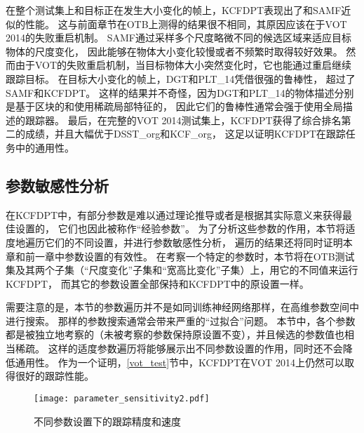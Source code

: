 在整个测试集上和目标正在发生大小变化的帧上，KCFDPT表现出了和SAMF近似的性能。
这与前面章节在OTB上测得的结果很不相同，其原因应该在于VOT 2014的失败重启机制。
SAMF通过采样多个尺度略微不同的候选区域来适应目标物体的尺度变化，
因此能够在物体大小变化较慢或者不频繁时取得较好效果。
然而由于VOT的失败重启机制，当目标物体大小突然变化时，它也能通过重启继续跟踪目标。
在目标大小变化的帧上，DGT和PLT\_14凭借很强的鲁棒性，
超过了SAMF和KCFDPT。
这样的结果并不奇怪，因为DGT和PLT\_14的物体描述分别是基于区块的和使用稀疏局部特征的，
因此它们的鲁棒性通常会强于使用全局描述的跟踪器。
最后，在完整的VOT 2014测试集上，KCFDPT获得了综合排名第二的成绩，并且大幅优于DSST\_org和KCF\_org，
这足以证明KCFDPT在跟踪任务中的通用性。

\subsection{参数敏感性分析}
\label{parameter-sensitivity}

在KCFDPT中，有部分参数是难以通过理论推导或者是根据其实际意义来获得最佳设置的，
它们也因此被称作``经验参数''。
为了分析这些参数的作用，本节将适度地遍历它们的不同设置，并进行参数敏感性分析，
遍历的结果还将同时证明本章和前一章中参数设置的有效性。
在考察一个特定的参数时，本节将在OTB测试集及其两个子集（``尺度变化''子集和``宽高比变化''子集）上，用它的不同值来运行KCFDPT，
而其它的参数设置全部保持和KCFDPT中的原设置一样。

需要注意的是，本节的参数遍历并不是如同训练神经网络那样，在高维参数空间中进行搜索。
那样的参数搜索通常会带来严重的``过拟合''问题。
本节中，各个参数都是被独立地考察的（未被考察的参数保持原设置不变），并且候选的参数值也相当稀疏。
这样的适度参数遍历将能够展示出不同参数设置的作用，同时还不会降低通用性。
作为一个证明，\ref{vot_test}节中，KCFDPT在VOT 2014上仍然可以取得很好的跟踪性能。

\begin{figure}[htbp]
\centering
		\texttt{[image: parameter\_sensitivity2.pdf]}
	\caption{不同参数设置下的跟踪精度和速度}
	\label{parameter_sensitivity}
\end{figure}

